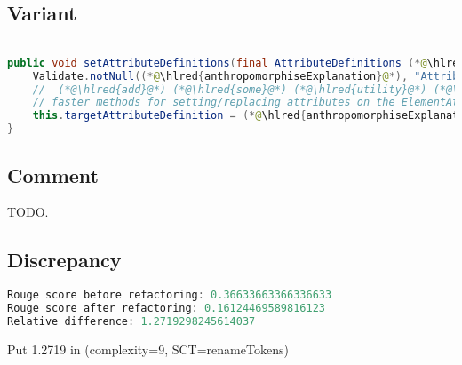\documentclass[11pt]{article}
\DeclareRobustCommand{\hlred}[1]{{\sethlcolor{YellowOrange}\hl{#1}}}
\begin{document}
\subsection{Variant}

\begin{lstlisting}[language=java]

public void setAttributeDefinitions(final AttributeDefinitions (*@\hlred{anthropomorphiseExplanation}@*)) {
    Validate.notNull((*@\hlred{anthropomorphiseExplanation}@*), "Attribute Definitions cannot be null");
    //  (*@\hlred{add}@*) (*@\hlred{some}@*) (*@\hlred{utility}@*) (*@\hlred{code}@*) (*@\hlred{or}@*) (*@\hlred{use}@*) (*@\hlred{these}@*) (*@\hlred{two}@*) (*@\hlred{and}@*) (*@\hlred{three}@*) to (*@\hlred{use}@*) (*@\hlred{generic}@*) (*@\hlred{types }@*)to (*@\hlred{allow}@*)
    // faster methods for setting/replacing attributes on the ElementAttributes implementation
    this.targetAttributeDefinition = (*@\hlred{anthropomorphiseExplanation}@*).forName(TEMPLATE_MODE, this.targetAttributeCompleteName);
}
\end{lstlisting}

\subsection{Comment}

TODO.

\subsection{Discrepancy}

\begin{lstlisting}[language=java]
Rouge score before refactoring: 0.36633663366336633
Rouge score after refactoring: 0.16124469589816123
Relative difference: 1.2719298245614037
\end{lstlisting}

Put 1.2719 in (complexity=9, SCT=renameTokens)
\end{document}
